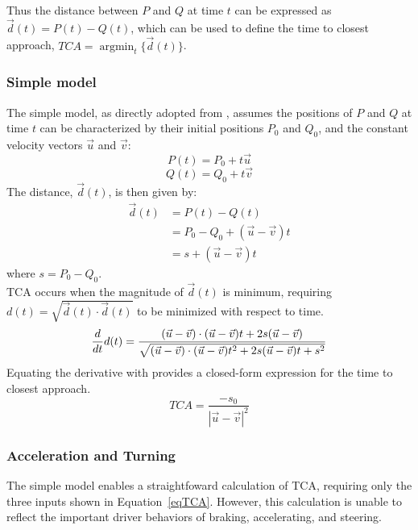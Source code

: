 \documentclass{article}
\begin{document}
Thus the distance between $P$ and $Q$ at time $t$ can be expressed as $\vec{d}(t) = P(t) - Q(t)$, which can be used to define the time to closest approach, $TCA = \operatorname*{argmin}_t \{ \vec{d}(t) \}$.

\subsubsection{Simple model}

The simple model, as directly adopted from \citet{Schwarz2014}, assumes the positions of $P$ and $Q$ at time $t$ can be characterized by their initial positions $P_0$ and $Q_0$, and the constant velocity vectors $\vec{u}$ and $\vec{v}$:
\begin{equation*}
    P(t) = P_0 + t\vec{u}
    \label{eqp}
\end{equation*}
\begin{equation*}
 Q(t) = Q_0 + t\vec{v}   
 \label{eqq}
\end{equation*}
The distance, $\vec{d}(t)$, is then given by:
\begin{equation*}
    \begin{split}
       \vec{d}(t) &= P(t) - Q(t) \\
       &= P_0 - Q_0 + (\vec{u} - \vec{v})t \\
       &= s + (\vec{u} - \vec{v})t
       \label{eqd}
    \end{split}
\end{equation*}
where $s = P_0 - Q_0$.\\
TCA occurs when the magnitude of $\vec{d}(t)$ is minimum, requiring $d(t) = \sqrt{\vec{d}(t)\cdot\vec{d}(t)}$ to be minimized with respect to time.
\begin{equation}
   \frac{d}{dt}d(t) = \frac{(\vec{u} - \vec{v})\cdot(\vec{u} - \vec{v})t+2s(\vec{u} - \vec{v})}{\sqrt{(\vec{u} - \vec{v})\cdot(\vec{u} - \vec{v})t^2+2s(\vec{u} - \vec{v})t + s^2}}
    \notag
\end{equation}
Equating the derivative with provides a closed-form expression for the time to closest approach.
\begin{equation}
\label{eqTCA}
 TCA = \displaystyle \frac{- s_0}{|\vec{u} - \vec{v}|^2}
\end{equation}

\subsubsection{Acceleration and Turning}

The simple model enables a straightfoward calculation of TCA, requiring only the three inputs shown in Equation~\eqref{eqTCA}. However, this calculation is unable to reflect the important driver behaviors of braking, accelerating, and steering.
\end{document}
